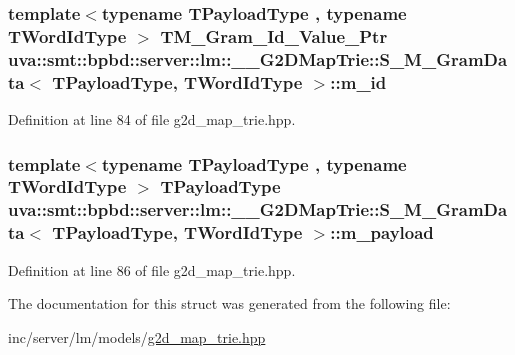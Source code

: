 \subsubsection[{m\+\_\+id}]{\setlength{\rightskip}{0pt plus 5cm}template$<$typename T\+Payload\+Type , typename T\+Word\+Id\+Type $>$ {\bf T\+M\+\_\+\+Gram\+\_\+\+Id\+\_\+\+Value\+\_\+\+Ptr} {\bf uva\+::smt\+::bpbd\+::server\+::lm\+::\+\_\+\+\_\+\+G2\+D\+Map\+Trie\+::\+S\+\_\+\+M\+\_\+\+Gram\+Data}$<$ T\+Payload\+Type, T\+Word\+Id\+Type $>$\+::m\+\_\+id}\label{structuva_1_1smt_1_1bpbd_1_1server_1_1lm_1_1_____g2_d_map_trie_1_1_s___m___gram_data_a49b4fadd9883c696728003dfe34ab068}


Definition at line 84 of file g2d\+\_\+map\+\_\+trie.\+hpp.

\hypertarget{structuva_1_1smt_1_1bpbd_1_1server_1_1lm_1_1_____g2_d_map_trie_1_1_s___m___gram_data_a6857a037ad8fa2dc5e69c0147a1ff01c}{}
\subsubsection[{m\+\_\+payload}]{\setlength{\rightskip}{0pt plus 5cm}template$<$typename T\+Payload\+Type , typename T\+Word\+Id\+Type $>$ T\+Payload\+Type {\bf uva\+::smt\+::bpbd\+::server\+::lm\+::\+\_\+\+\_\+\+G2\+D\+Map\+Trie\+::\+S\+\_\+\+M\+\_\+\+Gram\+Data}$<$ T\+Payload\+Type, T\+Word\+Id\+Type $>$\+::m\+\_\+payload}\label{structuva_1_1smt_1_1bpbd_1_1server_1_1lm_1_1_____g2_d_map_trie_1_1_s___m___gram_data_a6857a037ad8fa2dc5e69c0147a1ff01c}


Definition at line 86 of file g2d\+\_\+map\+\_\+trie.\+hpp.



The documentation for this struct was generated from the following file\+:\begin{DoxyCompactItemize}
\item 
inc/server/lm/models/\hyperlink{g2d__map__trie_8hpp}{g2d\+\_\+map\+\_\+trie.\+hpp}\end{DoxyCompactItemize}

